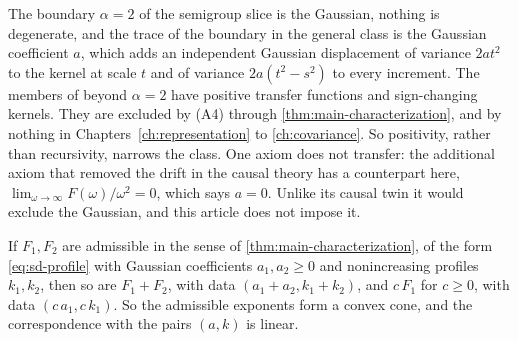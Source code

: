\begin{remark}\label{rem:boundary}
The boundary $\alpha = 2$ of the semigroup slice is the Gaussian, nothing is degenerate, and
the trace of the boundary in the general class is the Gaussian coefficient $a$, which adds an
independent Gaussian displacement of variance $2at^2$ to the kernel at scale $t$ and of
variance $2a(t^2 - s^2)$ to every increment. The members of  beyond
$\alpha = 2$ have positive transfer functions and sign-changing kernels. They are excluded by
(A4) through \ref{thm:main-characterization}, and by nothing in
Chapters~\ref{ch:representation} to \ref{ch:covariance}. So positivity, rather than
recursivity, narrows the class. One axiom does not transfer: the additional axiom that removed
the drift in the causal theory has a counterpart here,
$\lim_{\omega \to \infty} F(\omega)/\omega^2 = 0$, which says $a = 0$. Unlike its causal twin
it would exclude the Gaussian, and this article does not impose it.
\end{remark}

\begin{lemma}\label{lem:admissible-cone}
\leanok
If $F_1, F_2$ are admissible in the sense of \ref{thm:main-characterization}, of the form
\ref{eq:sd-profile} with Gaussian coefficients $a_1, a_2 \ge 0$ and nonincreasing profiles
$k_1, k_2$, then so are $F_1 + F_2$, with data $(a_1+a_2, k_1+k_2)$, and $c\,F_1$ for $c \ge 0$,
with data $(c\,a_1, c\,k_1)$. So the admissible exponents form a convex cone, and the
correspondence with the pairs $(a,k)$ is linear.
\statusT
\end{lemma}

